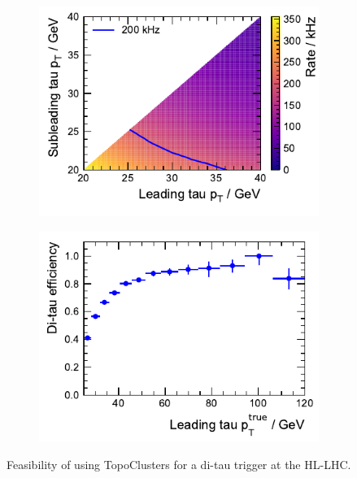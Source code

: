 \begin{figure}[htb]
  \centering
  \begin{subfigure}[t]{0.48\textwidth}
    \centering
    \includegraphics{./figures/rnn/trigger/pt_rate_reg.pdf}
    \label{fig:rate_vs_thresholds}
  \end{subfigure}\hfill
  \begin{subfigure}[t]{0.48\textwidth}
    \centering
    \includegraphics{./figures/rnn/trigger/taueff_reg.pdf}
    \label{fig:ditau_trigger_eff}
  \end{subfigure}
  \caption{Feasibility of using TopoClusters for a di-tau trigger at the
    HL-LHC.}
  \label{fig:rnn_ditau_trigger}
\end{figure}

